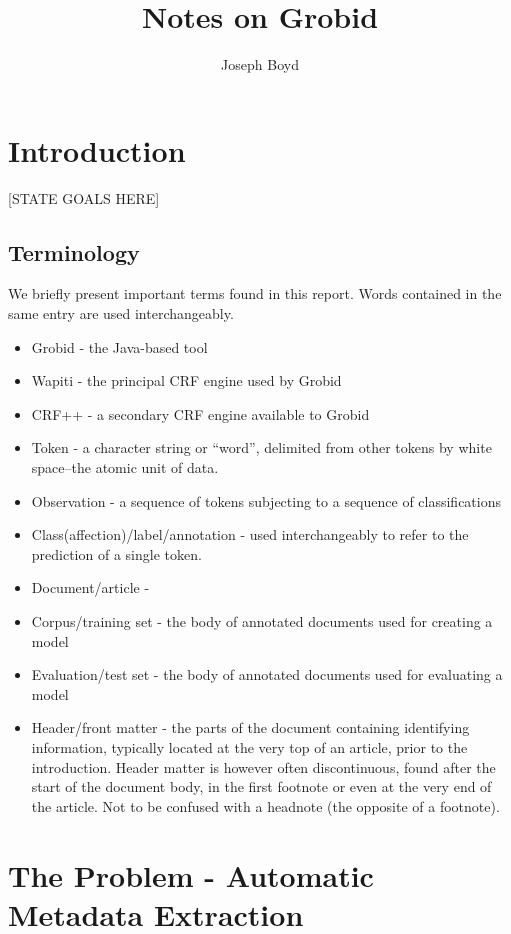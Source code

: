 \documentclass[11pt, oneside]{scrartcl}   	%
\title{Notes on Grobid}
\author{Joseph Boyd}
\date{}							%
\begin{document}
\maketitle

\section{Introduction}

[STATE GOALS HERE]

\subsection{Terminology}

We briefly present important terms found in this report. Words contained in the same entry are used interchangeably.

\begin{itemize}
\item Grobid - the Java-based tool 
\item Wapiti - the principal CRF engine used by Grobid
\item CRF++ - a secondary CRF engine available to Grobid
\item Token - a character string or ``word'', delimited from other tokens by white space--the atomic unit of data.
\item Observation - a sequence of tokens subjecting to a sequence of classifications
\item Class(affection)/label/annotation - used interchangeably to refer to the prediction of a single token.
\item Document/article - 
\item Corpus/training set - the body of annotated documents used for creating a model
\item Evaluation/test set - the body of annotated documents used for evaluating a model
\item Header/front matter - the parts of the document containing identifying information, typically located at the very top of an article, prior to the introduction. Header matter is however often discontinuous, found after the start of the document body, in the first footnote or even at the very end of the article. Not to be confused with a headnote (the opposite of a footnote).
\end{itemize}

\section{The Problem - Automatic Metadata Extraction}
\end{document}
